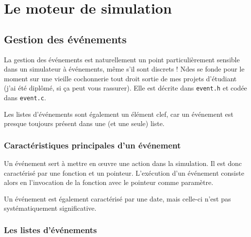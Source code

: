 %
\section{Le moteur de simulation}
\label{section:motsim}

%
\subsection{Gestion des événements}

   La gestion des événements est naturellement un point
particulièrement sensible dans un simulateur à événements, même s'il
sont discrets ! {\sc Ndes} se fonde pour le moment sur une vieille
cochonnerie tout droit sortie de mes projets d'étudiant (j'ai été
diplômé, si ça peut vous rassurer). Elle est décrite dans {\tt event.h}
et codée dans {\tt event.c}.

   Les listes d'événements sont également un élément clef, car un
événement est presque toujours présent dans une (et une seule) liste.

%
\subsubsection{Caractéristiques principales d'un événement}

   Un événement sert à mettre en \oe{}uvre une action dans la
simulation. Il est donc caractérisé par une fonction et un
pointeur. L'exécution d'un événement consiste alors en l'invocation de
la fonction avec le pointeur comme paramètre.

   Un événement est également caractérisé par une date, mais celle-ci
n'est pas systématiquement significative.

%
\subsubsection{Les listes d'événements}

